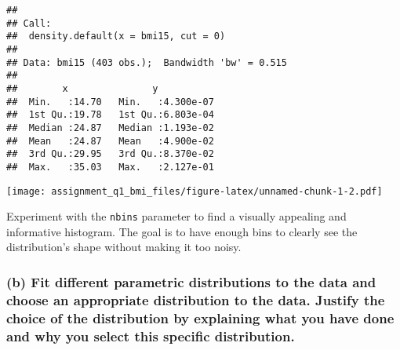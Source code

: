 \begin{verbatim}
## 
## Call:
##  density.default(x = bmi15, cut = 0)
## 
## Data: bmi15 (403 obs.);  Bandwidth 'bw' = 0.515
## 
##        x               y            
##  Min.   :14.70   Min.   :4.300e-07  
##  1st Qu.:19.78   1st Qu.:6.803e-04  
##  Median :24.87   Median :1.193e-02  
##  Mean   :24.87   Mean   :4.900e-02  
##  3rd Qu.:29.95   3rd Qu.:8.370e-02  
##  Max.   :35.03   Max.   :2.127e-01
\end{verbatim}

\begin{Shaded}
\begin{Highlighting}[]
\SpecialCharTok{:::}\SpecialCharTok{$}
                        \NormalTok{(}
                        \NormalTok{(}
                        \NormalTok{)}
\end{Highlighting}
\end{Shaded}

\texttt{[image: assignment\_q1\_bmi\_files/figure-latex/unnamed-chunk-1-2.pdf]}

Experiment with the \texttt{nbins} parameter to find a visually
appealing and informative histogram. The goal is to have enough bins to
clearly see the distribution's shape without making it too noisy.

\hypertarget{b-fit-different-parametric-distributions-to-the-data-and-choose-an-appropriate-distribution-to-the-data.-justify-the-choice-of-the-distribution-by-explaining-what-you-have-done-and-why-you-select-this-specific-distribution.}{%
\subsubsection{(b) Fit different parametric distributions to the data
and choose an appropriate distribution to the data. Justify the choice
of the distribution by explaining what you have done and why you select
this specific
distribution.}\label{b-fit-different-parametric-distributions-to-the-data-and-choose-an-appropriate-distribution-to-the-data.-justify-the-choice-of-the-distribution-by-explaining-what-you-have-done-and-why-you-select-this-specific-distribution.}}

